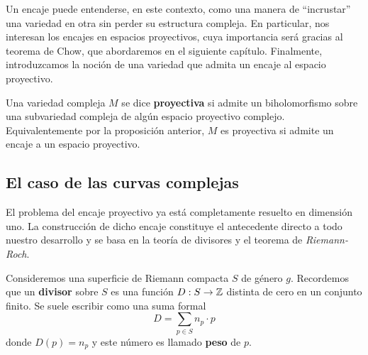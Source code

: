    	Un encaje puede entenderse, en este contexto, como una manera de \enquote{incrustar} una variedad en otra sin perder su estructura compleja. En particular, nos interesan los encajes en espacios proyectivos, cuya importancia será gracias al teorema de Chow, que abordaremos en el siguiente capítulo. Finalmente, introduzcamos la noción de una variedad que admita un encaje al espacio proyectivo.
   	
   	\begin{definition}
   		Una variedad compleja $M$ se dice \textbf{proyectiva} si admite un biholomorfismo sobre una subvariedad compleja de algún espacio proyectivo complejo. Equivalentemente por la proposición anterior, $M$ es proyectiva si admite un encaje a un espacio proyectivo.
   	\end{definition}
   	
   	\subsection{El caso de las curvas complejas}
   	
   	El problema del encaje proyectivo ya está completamente resuelto en dimensión uno. La construcción de dicho encaje constituye el antecedente directo a todo nuestro desarrollo y se basa en la teoría de divisores y el teorema de \textit{Riemann-Roch}.
   	
   	Consideremos una superficie de Riemann compacta $S$ de género $g$. Recordemos que un \textbf{divisor} sobre $S$ es una función $D:S\to \mathbb{Z}$ distinta de cero en un conjunto finito. Se suele escribir como una suma formal
   	\begin{equation*}
   		D=\sum_{p\in S} n_p\cdot p
   	\end{equation*}
   	donde $D(p)=n_p$ y este número es llamado \textbf{peso} de $p$.
   	
